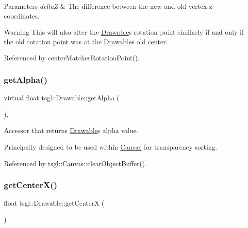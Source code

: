 \begin{DoxyParams}{Parameters}
{\em deltaZ} & The difference between the new and old vertex z coordinates. \\
\hline
\end{DoxyParams}
\begin{DoxyWarning}{Warning}
This will also alter the \hyperlink{classtsgl_1_1_drawable}{Drawable}\textquotesingle{}s rotation point similarly if and only if the old rotation point was at the \hyperlink{classtsgl_1_1_drawable}{Drawable}\textquotesingle{}s old center. 
\end{DoxyWarning}


Referenced by center\+Matches\+Rotation\+Point().

\mbox{\label{classtsgl_1_1_drawable_aa153a0c0a4eaaa9bf4b7640508d58850}} 
\subsubsection{\texorpdfstring{get\+Alpha()}{getAlpha()}}
{\footnotesize\ttfamily virtual float tsgl\+::\+Drawable\+::get\+Alpha (\begin{DoxyParamCaption}{ }\end{DoxyParamCaption})\hspace{0.3cm}{\ttfamily [inline]}, {\ttfamily [virtual]}}



Accessor that returns \hyperlink{classtsgl_1_1_drawable}{Drawable}\textquotesingle{}s alpha value. 

Principally designed to be used within \hyperlink{classtsgl_1_1_canvas}{Canvas} for transparency sorting. 

Referenced by tsgl\+::\+Canvas\+::clear\+Object\+Buffer().

\mbox{\label{classtsgl_1_1_drawable_a170ce95eaae8b19532420e42e9eb8abf}} 
\subsubsection{\texorpdfstring{get\+Center\+X()}{getCenterX()}}
{\footnotesize\ttfamily float tsgl\+::\+Drawable\+::get\+CenterX (\begin{DoxyParamCaption}{ }\end{DoxyParamCaption})\hspace{0.3cm}{\ttfamily [virtual]}}



